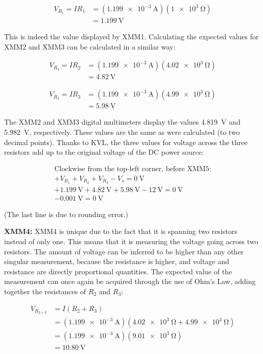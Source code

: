 \documentclass{article}
\begin{document}
\begin{align*}
    V_{R_1} = IR_1 &= (\SI{1.199e-3}{\ampere})(\SI{1e3}{\ohm}) \\
    &= \SI{1.199}{\volt}
\end{align*}

\pagebreak

This is indeed the value displayed by XMM1. Calculating
the expected values for XMM2 and XMM3 can be calculated
in a similar way:

\begin{align*}
    V_{R_2} = IR_2 &= (\SI{1.199e-3}{\ampere})(\SI{4.02e3}{\ohm})\\
    &= \SI{4.82}{\volt}
\end{align*}

\begin{align*}
    V_{R_3}=IR_3 &= (\SI{1.199e-3}{\ampere})(\SI{4.99e3}{\ohm})\\
    &= \SI{5.98}{\volt}
\end{align*}

The XMM2 and XMM3 digital multimeters display the values
\SI{4.819}{\volt} and \SI{5.982}{\volt}, respectively.
These values are the same as were calculated
(to two decimal points). Thanks to KVL, the three values for
voltage across the three resistors add up to the original
voltage of the DC power source:

\begin{gather*}
    \text{Clockwise from the top-left corner, before XMM5:}\\
    +V_{R_1} + V_{R_2} + V_{R_3} - V_s = \SI{0}{\volt}\\
    +\SI{1.199}{\volt} + \SI{4.82}{\volt} + \SI{5.98}{\volt} - \SI{12}{\volt} = \SI{0}{\volt}\\
    \SI{-0.001}{\volt} = \SI{0}{\volt}
\end{gather*}

\noindent (The last line is due to rounding error.)

\textbf{XMM4:}
XMM4 is unique due to the fact that it is spanning two
resistors instead of only one. This means that it is measuring
the voltage going across two resistors. The amount of voltage can be
inferred to be higher than any other singular measurement,
because the resistance is higher, and voltage and resistance
are directly proportional quantities. The expected value
of the measurement can once again be acquired through the use
of Ohm's Law, adding together the resistances of $R_2$ and $R_3$:

\begin{align*}
    V_{R_{2+3}} &= I(R_2 + R_3)\\
    &= (\SI{1.199e-3}{\ampere})
    (\SI{4.02e3}{\ohm} + \SI{4.99e3}{\ohm})\\
    &= (\SI{1.199e-3}{\ampere})(\SI{9.01e3}{\ohm})\\
    &= \SI{10.80}{\volt}
\end{align*}
\end{document}
